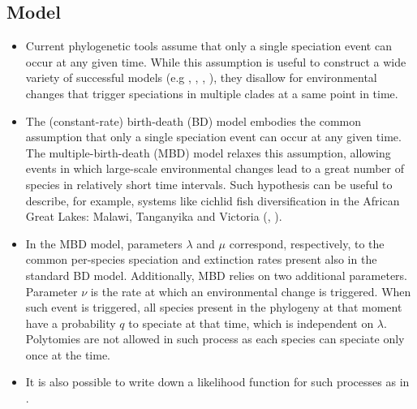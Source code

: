 \documentclass{article}
\begin{document}
\subsection{Model}
\begin{itemize}

\item Current phylogenetic tools assume that only a single speciation event 
can occur at any given time.
While this assumption is useful to construct a wide variety of successful 
models (e.g \cite{Maddison2007biSSE}, \cite{Valente2015}, 
\cite{etienne2012diversity}, \cite{etienne2014estimating}),
they disallow for environmental changes that trigger speciations 
in multiple clades at a same point in time. 

\item The (constant-rate) birth-death (BD) model 
embodies the common assumption that 
only a single speciation event can occur at any given time.
The multiple-birth-death (MBD) model relaxes this assumption, 
allowing events in which 
large-scale environmental changes lead to a great number of species 
in relatively short time intervals. 
Such hypothesis can be useful to describe, for example, 
systems like cichlid fish diversification in the 
African Great Lakes: Malawi, Tanganyika and Victoria 
(\cite{janzen2016}, \cite{janzen2017}).

\item In the MBD model, parameters $\lambda$ and $\mu$ correspond, respectively, 
to the common per-species speciation and extinction rates present 
also in the standard BD model. 
Additionally, MBD relies on two additional parameters. 
Parameter $\nu$ is the rate at which an environmental change is triggered.
When such event is triggered, 
all species present in the phylogeny at that moment
have a probability $q$ to speciate at that time, which is 
independent on $\lambda$. 
Polytomies are not allowed in such process 
as each species can speciate only once at the time.

\item It is also possible to write down a likelihood function 
for such processes as in \cite{mbd}.
    
\end{itemize}
\end{document}
